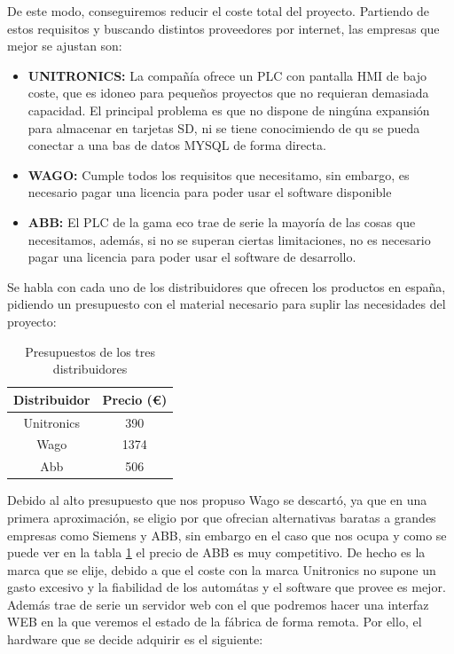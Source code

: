 De este modo, conseguiremos reducir el coste total del proyecto. Partiendo de estos requisitos y buscando distintos proveedores por internet, las empresas que mejor se ajustan son:

\begin{itemize}
		\item{\textbf{UNITRONICS:} La compañía ofrece un PLC con pantalla HMI de bajo coste, que es idoneo para pequeños proyectos que no requieran demasiada capacidad. El principal problema es que no dispone de ningúna expansión para almacenar en tarjetas SD, ni se tiene conocimiendo de qu se pueda conectar a una bas de datos MYSQL de forma directa.}
		\item{\textbf{WAGO:} Cumple todos los requisitos que necesitamo, sin embargo, es necesario pagar una licencia para poder usar el software disponible}
		\item{\textbf{ABB:} El PLC de la gama eco trae de serie la mayoría de las cosas que necesitamos, además, si no se superan ciertas limitaciones, no es necesario pagar una licencia para poder usar el software de desarrollo.}
\end{itemize}

Se habla con cada uno de los distribuidores que ofrecen los productos en españa, pidiendo un presupuesto con el material necesario para suplir las necesidades del proyecto:

\begin{table}[H]
\centering
\begin{tabular}{cc}
{\bf Distribuidor} & {\bf Precio (\euro{})} \\ \hline
Unitronics         & 390              \\
Wago               & 1374             \\
Abb                & 506              \\ \hline
\end{tabular}
\caption{Presupuestos de los tres distribuidores}
\label{tab:presupuestos}
\end{table}


Debido al alto presupuesto que nos propuso Wago se descartó, ya que en una primera aproximación, se eligio por que ofrecian alternativas baratas a grandes empresas como Siemens y ABB, sin embargo en el caso que nos ocupa y como se puede ver en la tabla \ref{tab:presupuestos} el precio de ABB es muy competitivo. De hecho es la marca que se elije, debido a que el coste con la marca Unitronics no supone un gasto excesivo y la fiabilidad de los automátas y el software que provee es mejor. Además trae de serie un servidor web con el que podremos hacer una interfaz WEB en la que veremos el estado de la fábrica de forma remota. Por ello, el hardware que se decide adquirir es el siguiente:

